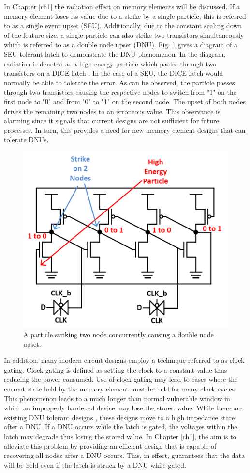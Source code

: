 In Chapter \ref{ch1} the radiation effect on memory elements will be discussed. If a memory element loses its value due to a strike by a single particle, this is referred to as a single event upset (SEU). Additionally, due to the constant scaling down of the feature size, a single particle can also strike two transistors simultaneously which is referred to as a double node upset (DNU). Fig. \ref{DNUStrike} gives a diagram of a SEU tolerant latch to demonstrate the DNU phenomenon. In the diagram, radiation is denoted as a high energy particle which passes through two transistors on a DICE latch \cite{DICE}. In the case of a SEU, the DICE latch would normally be able to tolerate the error. As can be observed, the particle passes through two transistors causing the respective nodes to switch from "1" on the first node to "0" and from "0" to "1" on the second node. The upset of both nodes drives the remaining two nodes to an erroneous value. This observance is alarming since it signals that current designs are not sufficient for future processes. In turn, this provides a need for new memory element designs that can tolerate DNUs. 

\begin{figure}[!htbp]
	\centering
	\includegraphics[width=0.45\linewidth]{Figures/StrikeonDICE}
	\caption{A particle striking two node concurrently causing a double node upset.}
	\label{DNUStrike}
\end{figure} 

In addition, many modern circuit designs employ a technique referred to as clock gating. Clock gating is defined as setting the clock to a constant value thus reducing the power consumed. Use of clock gating may lead to cases where the current state held by the memory element must be held for many clock cycles. This phenomenon leads to a much longer than normal vulnerable window in which an improperly hardened device may lose the stored value. While there are existing DNU tolerant designs \cite{Inter,DNCS,HSMUF}, these designs move to a high impedance state after a DNU. If a DNU occurs while the latch is gated, the voltages within the latch may degrade thus losing the stored value. In Chapter \ref{ch1}, the aim is to alleviate this problem by providing an efficient design that is capable of recovering all nodes after a DNU occurs. This, in effect, guarantees that the data will be held even if the latch is struck by a DNU while gated.

